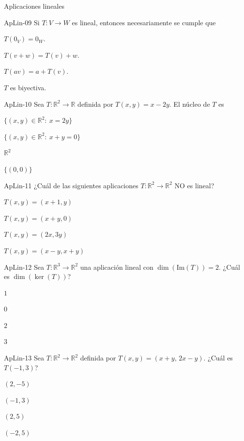 \documentclass[a4,11pt]{aleph-notas}
\begin{document}
\begin{quiz}{Aplicaciones lineales}
\begin{multi}[]%
    {ApLin-09}
    Si \(T:V\to W\) es lineal, entonces necesariamente se cumple que
    \item* \(T(0_V)=0_W\).
    \item \(T(v+w)=T(v)+w\).
    \item \(T(av)=a+T(v)\).
    \item \(T\) es biyectiva.
\end{multi}

\begin{multi}[]%
    {ApLin-10}
    Sea \(T:\mathbb{R}^2\to\mathbb{R}\) definida por \(T(x,y)=x-2y\). El núcleo de \(T\) es
    \item* \(\{(x,y)\in\mathbb{R}^2:\ x=2y\}\)
    \item \(\{(x,y)\in\mathbb{R}^2:\ x+y=0\}\)
    \item \(\mathbb{R}^2\)
    \item \(\{(0,0)\}\)
\end{multi}

\begin{multi}[]%
    {ApLin-11}
    ¿Cuál de las siguientes aplicaciones \(T:\mathbb{R}^2\to\mathbb{R}^2\) NO es lineal?
    \item* \(T(x,y)=(x+1,y)\)
    \item \(T(x,y)=(x+y,0)\)
    \item \(T(x,y)=(2x,3y)\)
    \item \(T(x,y)=(x-y,x+y)\)
\end{multi}

\begin{multi}[]%
    {ApLin-12}
    Sea \(T:\mathbb{R}^3\to\mathbb{R}^2\) una aplicación lineal con \(\dim(\mathrm{Im}(T))=2\). ¿Cuál es \(\dim(\ker(T))\)?
    \item* \(1\)
    \item \(0\)
    \item \(2\)
    \item \(3\)
\end{multi}

\begin{multi}[]%
    {ApLin-13}
    Sea \(T:\mathbb{R}^2\to\mathbb{R}^2\) definida por \(T(x,y)=(x+y,\,2x-y)\). ¿Cuál es \(T(-1,3)\)?
    \item* \((2,-5)\)
    \item \((-1,3)\)
    \item \((2,5)\)
    \item \((-2,5)\)
\end{multi}

\end{quiz}
\end{document}
